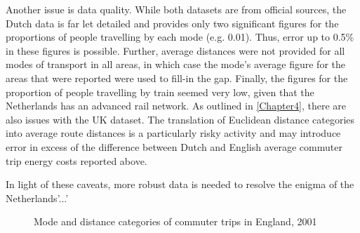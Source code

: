 Another issue is data quality. While both datasets
are from official sources, the Dutch data is far let detailed and provides
only two significant figures for the proportions of people travelling by each
mode (e.g. 0.01). Thus, error up to 0.5\% in these figures is possible.
Further, average distances were not provided for all modes of transport in all
areas, in which case the mode's average figure for the areas that were reported
were used to fill-in the gap. Finally, the figures for the proportion of people
travelling by train seemed very low, given that the Netherlands has an
advanced rail network. As outlined in \cref{Chapter4}, %
there are also issues with the UK dataset. The translation of
Euclidean distance
categories into average route distances is a particularly risky
activity and may introduce error in excess of the difference between
Dutch and English average commuter trip energy costs reported above.

In light of these caveats, more robust data is needed to resolve the
enigma of the Netherlands'...'

% 






\begin{figure}[htbp]
  \caption[Mode and distance categories of commute in England]
  {Mode and distance categories of commuter trips in England, 2001}
  \label{fengmodedis}
\end{figure} %


